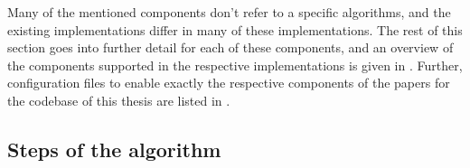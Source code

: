 Many of the mentioned components don't refer to a specific algorithms, and the existing implementations \mainalgos differ in many of these implementations. The rest of this section goes into further detail for each of these components, and an overview of the components supported in the respective implementations is given in . Further, configuration files to enable exactly the respective components of the papers \mainalgos for the codebase of this thesis are listed in .



\subsection{Steps of the algorithm}

\label{sec:algorithm_steps}



